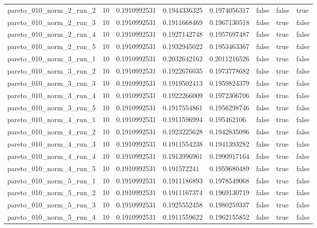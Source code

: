 \begin{tabular}{@{}llllllll@{}}
pareto\_010\_norm\_2\_run\_2 & 10 & 0.1910992531 & 0.1944336325 & 0.1974056317 & false & false & true \\
pareto\_010\_norm\_2\_run\_3 & 10 & 0.1910992531 & 0.1911668469 & 0.1967130518 & false & true & false \\
pareto\_010\_norm\_2\_run\_4 & 10 & 0.1910992531 & 0.1927142748 & 0.1957697487 & false & true & false \\
pareto\_010\_norm\_2\_run\_5 & 10 & 0.1910992531 & 0.1932945022 & 0.1953463367 & false & true & false \\
pareto\_010\_norm\_3\_run\_1 & 10 & 0.1910992531 & 0.2032642162 & 0.2011216526 & false & true & false \\
pareto\_010\_norm\_3\_run\_2 & 10 & 0.1910992531 & 0.1922676035 & 0.1973778682 & false & true & false \\
pareto\_010\_norm\_3\_run\_3 & 10 & 0.1910992531 & 0.1919502413 & 0.1959824379 & false & true & false \\
pareto\_010\_norm\_3\_run\_4 & 10 & 0.1910992531 & 0.1922266009 & 0.1972306706 & false & true & false \\
pareto\_010\_norm\_3\_run\_5 & 10 & 0.1910992531 & 0.1917554861 & 0.1956298746 & false & true & false \\
pareto\_010\_norm\_4\_run\_1 & 10 & 0.1910992531 & 0.1911596994 & 0.195462106 & false & true & false \\
pareto\_010\_norm\_4\_run\_2 & 10 & 0.1910992531 & 0.1923225628 & 0.1942835096 & false & true & false \\
pareto\_010\_norm\_4\_run\_3 & 10 & 0.1910992531 & 0.1911554238 & 0.1941393282 & false & true & false \\
pareto\_010\_norm\_4\_run\_4 & 10 & 0.1910992531 & 0.1913996961 & 0.1990917164 & false & true & false \\
pareto\_010\_norm\_4\_run\_5 & 10 & 0.1910992531 & 0.191572241 & 0.1959680489 & false & true & false \\
pareto\_010\_norm\_5\_run\_1 & 10 & 0.1910992531 & 0.1911186893 & 0.1978549068 & false & true & false \\
pareto\_010\_norm\_5\_run\_2 & 10 & 0.1910992531 & 0.1911167374 & 0.1969130719 & false & true & false \\
pareto\_010\_norm\_5\_run\_3 & 10 & 0.1910992531 & 0.1925552458 & 0.1980259337 & false & true & false \\
pareto\_010\_norm\_5\_run\_4 & 10 & 0.1910992531 & 0.1911559622 & 0.1962155852 & false & true & false \\

\end{tabular}
